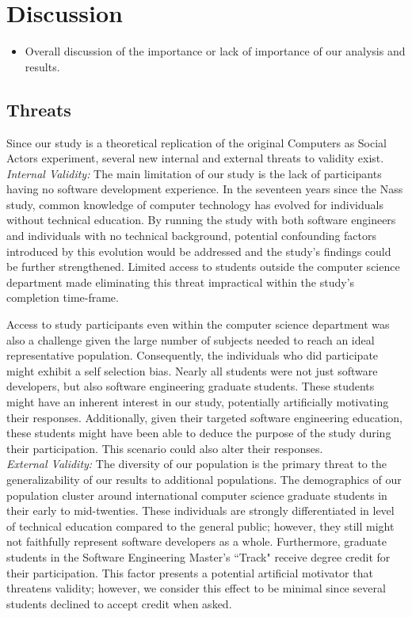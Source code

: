 \documentclass{sig-alternate-05-2015}
\begin{document}
\section{Discussion}

\begin{itemize}
    \item Overall discussion of the importance or lack of importance of our analysis and results.
\end{itemize}

\subsection{Threats}

Since our study is a theoretical replication of the original Computers as Social Actors experiment, several new internal and external threats to validity exist.\\

\emph{Internal Validity:} The main limitation of our study is the lack of participants having no software development experience. In the seventeen years since the Nass study, common knowledge of computer technology has evolved for individuals without technical education. By running the study with both software engineers and individuals with no technical background, potential confounding factors introduced by this evolution would be addressed and the study's findings could be further strengthened. Limited access to students outside the computer science department made eliminating this threat impractical within the study's completion time-frame. 

Access to study participants even within the computer science department was also a challenge given the large number of subjects needed to reach an ideal representative population. Consequently, the individuals who did participate might exhibit a self selection bias. Nearly all students were not just software developers, but also software engineering graduate students. These students might have an inherent interest in our study, potentially artificially motivating their responses. Additionally, given their targeted software engineering education, these students might have been able to deduce the purpose of the study during their participation. This scenario could also alter their responses.\\

\emph{External Validity:} The diversity of our population is the primary threat to the generalizability of our results to additional populations. The demographics of our population cluster around international computer science graduate students in their early to mid-twenties. These individuals are strongly differentiated in level of technical education compared to the general public; however, they still might not faithfully represent software developers as a whole. Furthermore, graduate students in the Software Engineering Master's ``Track" receive degree credit for their participation. This factor presents a potential artificial motivator that threatens validity; however, we consider this effect to be minimal since several students declined to accept credit when asked.   
\end{document}
